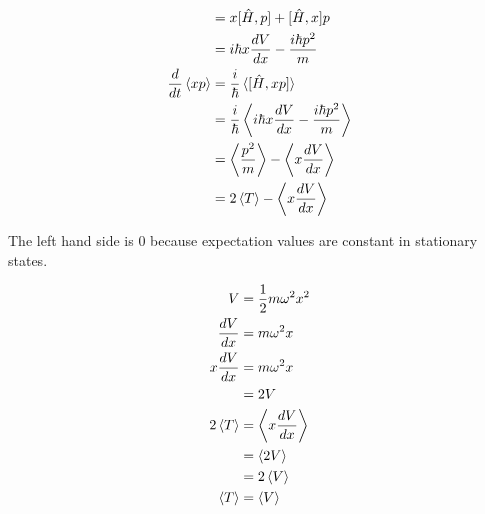 \documentclass{article}
\begin{document}
\subsection{}

\begin{align*}
  [\hat{H}, x p]             & = x [\hat{H}, p] + [\hat{H}, x] p                                            \\
                             & = i \hbar x \frac{d V}{d x} - \frac{i \hbar p^2}{m}                          \\
  \frac{d}{d t} \braket{x p} & = \frac{i}{\hbar} \braket{[\hat{H}, x p]}                                    \\
                             & = \frac{i}{\hbar} \Braket{i \hbar x \frac{d V}{d x} - \frac{i \hbar p^2}{m}} \\
                             & = \Braket{\frac{p^2}{m}} - \Braket{x \frac{d V}{d x}}                        \\
                             & = 2 \braket{T} - \Braket{x \frac{d V}{d x}}
\end{align*}

The left hand side is $0$ because expectation values are constant in stationary states.

\begin{align*}
  V                 & = \frac{1}{2} m \omega^2 x^2 \\
  \frac{d V}{d x}   & = m \omega^2 x               \\
  x \frac{d V}{d x} & = m \omega^2 x               \\
                    & = 2 V                        \\
  2 \braket{T}      & = \Braket{x \frac{d V}{d x}} \\
                    & = \braket{2 V}               \\
                    & = 2 \braket{V}               \\
  \braket{T}        & = \braket{V}
\end{align*}

\subsection{}
\end{document}
